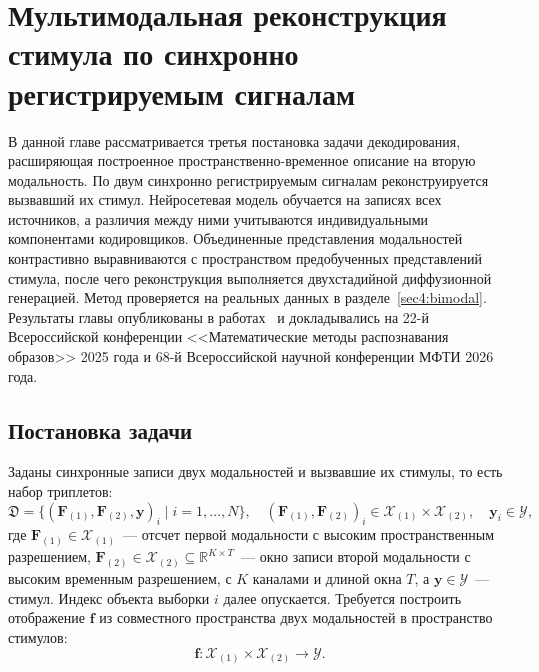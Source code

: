 \chapter{Мультимодальная реконструкция стимула по синхронно регистрируемым сигналам}\label{ch:bimodal}

В данной главе рассматривается третья постановка задачи декодирования, расширяющая построенное пространственно-временное описание на вторую модальность. По двум синхронно регистрируемым сигналам реконструируется вызвавший их стимул. Нейросетевая модель обучается на записях всех источников, а различия между ними учитываются индивидуальными компонентами кодировщиков. Объединенные представления модальностей контрастивно выравниваются с пространством предобученных представлений стимула, после чего реконструкция выполняется двухстадийной диффузионной генерацией. Метод проверяется на реальных данных в разделе~\ref{sec4:bimodal}. Результаты главы опубликованы в работах~\cite{dorin2026decoding, dorin2025mmro, dorin2026conf68mipt} и докладывались на 22-й Всероссийской конференции <<Математические методы распознавания образов>> 2025 года и 68-й Всероссийской научной конференции МФТИ 2026 года.

\section{Постановка задачи}\label{sec2:bimodal}

Заданы синхронные записи двух модальностей и вызвавшие их стимулы, то есть набор триплетов:
\begin{equation*}\mathfrak{D} = \{(\mathbf{F}_{(1)}, \mathbf{F}_{(2)}, \mathbf{y})_i \mid i = 1, \ldots, N \}, \quad (\mathbf{F}_{(1)}, \mathbf{F}_{(2)})_i \in \mathcal{X}_{(1)} \times \mathcal{X}_{(2)}, \quad \mathbf{y}_i \in \mathcal{Y},
\end{equation*}
где $\mathbf{F}_{(1)} \in \mathcal{X}_{(1)}$~--- отсчет первой модальности с высоким пространственным разрешением, $\mathbf{F}_{(2)} \in \mathcal{X}_{(2)} \subseteq \mathbb{R}^{K \times T}$~--- окно записи второй модальности с высоким временным разрешением, с $K$ каналами и длиной окна $T$, а $\mathbf{y} \in \mathcal{Y}$~--- стимул. Индекс объекта выборки $i$ далее опускается. Требуется построить отображение $\mathbf{f}$ из совместного пространства двух модальностей в пространство стимулов:
\begin{equation}\label{eq:target}
    \mathbf{f}:  \mathcal{X}_{(1)} \times \mathcal{X}_{(2)} \rightarrow \mathcal{Y}.
\end{equation}

